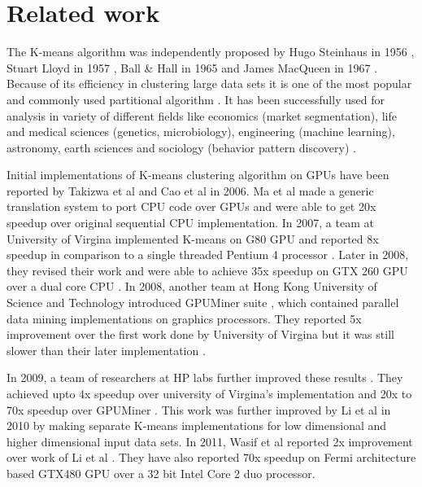 \section{Related work}

The K-means algorithm was independently proposed by Hugo Steinhaus in 1956 \cite{hugo}, Stuart Lloyd in 1957 \cite{lloyd}, Ball \& Hall in 1965 \cite{ball_hall} and James MacQueen in 1967 \cite{macqueen}.
Because of its efficiency in clustering large data sets it is one of the most popular and commonly used partitional algorithm \cite{jain:2009}.
It has been successfully used for analysis in variety of different fields like economics (market segmentation), life and medical sciences (genetics, microbiology), engineering (machine learning), astronomy, earth sciences and sociology (behavior pattern discovery) \cite{Xu:2009}. 

Initial implementations of K-means clustering algorithm on GPUs have been reported by Takizwa et al \cite{takizawa} and Cao et al \cite{cao} in 2006. Ma et al \cite{ma} made a generic translation system to port CPU code over GPUs and were able to get 20x speedup over original sequential CPU implementation. In 2007, a team at University of Virgina implemented K-means on G80 GPU and reported 8x speedup in comparison to a single threaded Pentium 4 processor \cite{che2007}. Later in 2008, they revised their work and were able to achieve 35x speedup on GTX 260 GPU over a dual core CPU \cite{che_et_al}. In 2008, another team at Hong Kong University of Science and Technology introduced GPUMiner suite \cite{gpuminer}, which contained parallel data mining implementations on graphics processors. They reported 5x improvement over the first work \cite{che2007} done by University of Virgina but it was still slower than their later implementation \cite{che_et_al}.

In 2009, a team of researchers at HP labs further improved these results \cite{wu_hp}. They achieved upto 4x speedup over university of Virgina's implementation \cite{che_et_al} and 20x to 70x speedup over GPUMiner \cite{gpuminer}. This work was further improved by Li et al \cite{li_et_al} in 2010 by making separate K-means implementations for low dimensional and higher dimensional input data sets. In 2011, Wasif et al \cite{wasif_et_al} reported 2x improvement over work of Li et al \cite{li_et_al}. They have also reported 70x speedup on Fermi architecture based GTX480 GPU over a 32 bit Intel Core 2 duo processor.

